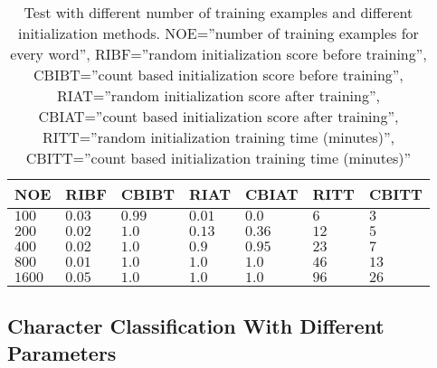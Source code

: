 \begin{table}[htb]
  \begin{center}
  \begin{tabular}{ l l l l l l l }
    NOE    & RIBF   & CBIBT  & RIAT    & CBIAT  & RITT & CBITT\\ \hline
    $100$  & $0.03$ & $0.99$ & $0.01$  & $0.0$  & $6$  & $3$\\ 
    $200$  & $0.02$ & $1.0$  & $0.13$  & $0.36$ & $12$ & $5$\\ 
    $400$  & $0.02$ & $1.0$  & $0.9$   & $0.95$ & $23$ & $7$\\
    $800$  & $0.01$ & $1.0$  & $1.0$   & $1.0$  & $46$ & $13$\\   
    $1600$ & $0.05$ & $1.0$  & $1.0$   & $1.0$  & $96$ & $26$\\  
  \end{tabular}
\end{center}
\caption{Test with different number of training examples and different initialization methods.
	 NOE=''number of training examples for every word'',
         RIBF=''random initialization score before training'',
         CBIBT=''count based initialization score before training'',
         RIAT=''random initialization score after training'',
         CBIAT=''count based initialization score after training'',
         RITT=''random initialization training time (minutes)'',
         CBITT=''count based initialization training time (minutes)''} 
\label{tab:word_classifier_results_generated_data} 
\end{table}

\subsection{Character Classification With Different Parameters}

